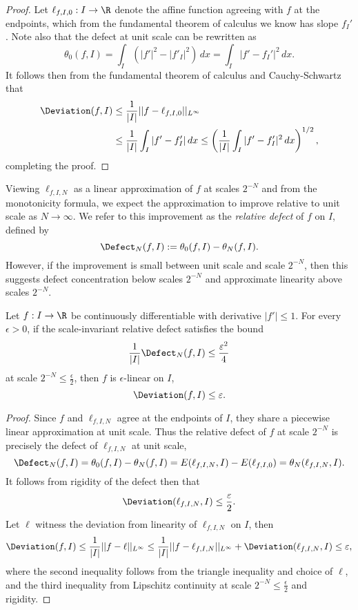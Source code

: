 \begin{proof}
	Let $\ell_{f, I, 0} : I \to \R$ denote the affine function agreeing with $f$ at the endpoints, which from the fundamental theorem of calculus we know has slope $f_I'$. Note also that the defect at unit scale can be rewritten as
		\[ \theta_0 (f, I) = \int_I (|f'|^2 - |f'_I|^2) \, dx = \int_I |f' - f_I'|^2 \, dx. \]
	It follows then from the fundamental theorem of calculus and Cauchy-Schwartz that
		\begin{align*}
			 \Deviation (f, I) 
			 	&\leq \frac{1}{|I|} || f - \ell_{f, I, 0} ||_{L^\infty} \\
			 	&\leq \frac{1}{|I|}  \int_I |f' - f'_I| \, dx \leq \left( \frac{1}{|I|} \int_I |f' - f_I'|^2 \, dx \right)^{1/2},
		\end{align*}	 
	completing the proof. 	
\end{proof}

Viewing $\ell_{f, I, N}$ as a linear approximation of $f$ at scales $2^{-N}$ and from the monotonicity formula, we expect the approximation to improve relative to unit scale as $N \to \infty$. We refer to this improvement as the \emph{relative defect} of $f$ on $I$, defined by 
	\[ \Defect_N (f, I) := \theta_0 (f, I) - \theta_N (f, I).  \]
However, if the improvement is small between unit scale and scale $2^{-N}$, then this suggests defect concentration below scales $2^{-N}$ and approximate linearity above scales $2^{-N}$. 

\begin{lemma}
	Let $f: I \to \R$ be continuously differentiable with derivative $|f'| \leq 1$. For every $\epsilon > 0$, if the scale-invariant relative defect satisfies the bound
		\[  \frac{1}{|I|} \Defect_{N} (f, I) \leq \frac{\epsilon^2}{4} \]
	at scale $2^{-N} \leq \tfrac\epsilon2$, then $f$ is $\epsilon$-linear on $I$, 
		\[ \Deviation (f, I) \leq \epsilon. \]	
\end{lemma}

\begin{proof}
	Since $f$ and $\ell_{f, I, N}$ agree at the endpoints of $I$, they share a piecewise linear approximation at unit scale. Thus the relative defect of $f$ at scale $2^{-N}$ is precisely the defect of $\ell_{f, I, N}$ at unit scale, 
		\[ \Defect_N (f, I) = \theta_0 (f, I) - \theta_N (f, I) = E(\ell_{f, I, N}, I) - E(\ell_{f, I, 0}) = \theta_N (\ell_{f, I, N}, I).\]
	It follows from rigidity of the defect then that
		\[ \Deviation (\ell_{f, I, N}, I) \leq \frac{\epsilon}{2}. \]
	Let $\ell$ witness the deviation from linearity of $\ell_{f, I, N}$ on $I$, then 
		\[ \Deviation(f, I) \leq \frac{1}{|I|} ||f - \ell||_{L^\infty} \leq \frac{1}{|I|} ||f - \ell_{f, I, N}||_{L^\infty} + \Deviation (\ell_{f, I, N}, I) \leq \epsilon, \]
	where the second inequality follows from the triangle inequality and choice of $\ell$, and the third inequality from Lipschitz continuity at scale $2^{-N} \leq \tfrac{\epsilon}{2}$ and rigidity. 
\end{proof}


